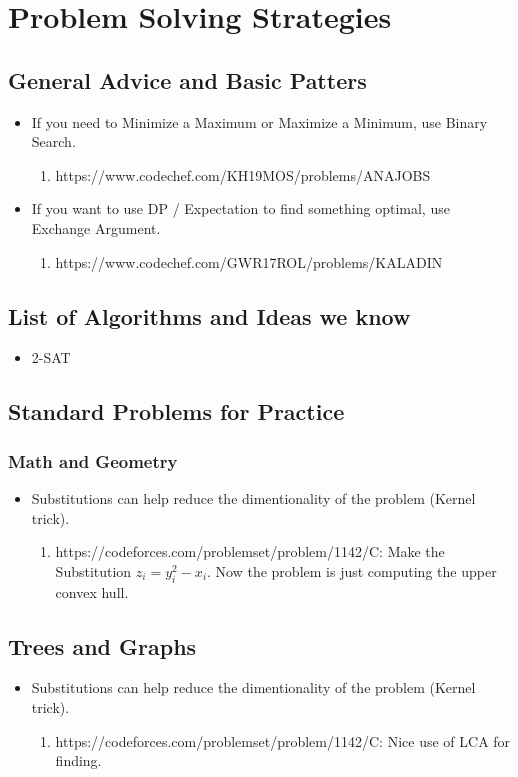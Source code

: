 \chapter{Problem Solving Strategies}


\section{General Advice and Basic Patters}

\begin{itemize}
    \item If you need to Minimize a Maximum or Maximize a Minimum, use Binary Search.
    \begin{enumerate}
        \item https://www.codechef.com/KH19MOS/problems/ANAJOBS
    \end{enumerate}
    \item If you want to use DP / Expectation to find something optimal, use Exchange Argument.
    \begin{enumerate}
        \item https://www.codechef.com/GWR17ROL/problems/KALADIN
    \end{enumerate}
\end{itemize}

\section{List of Algorithms and Ideas we know}

\begin{itemize}
    \item 2-SAT
\end{itemize}

\section{Standard Problems for Practice}

\subsection{Math and Geometry}

\begin{itemize}
    \item Substitutions can help reduce the dimentionality of the problem (Kernel trick).
    \begin{enumerate}
        \item https://codeforces.com/problemset/problem/1142/C: Make the Substitution $z_{i} = y_{i}^{2} - x_{i}$. Now the problem is just computing the upper convex hull.
    \end{enumerate}
\end{itemize}

\section{Trees and Graphs}

\begin{itemize}
    \item Substitutions can help reduce the dimentionality of the problem (Kernel trick).
    \begin{enumerate}
        \item https://codeforces.com/problemset/problem/1142/C: Nice use of LCA for finding.
    \end{enumerate}
\end{itemize}

